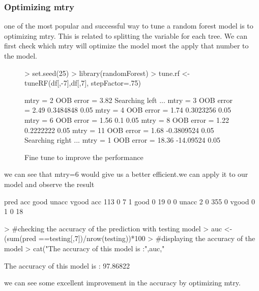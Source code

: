 \documentclass{article}
\begin{document}
\subsubsection{Optimizing mtry}
one of the  most popular and successful way to tune a random forest model is to optimizing mtry. This is related to splitting the variable for each tree. We can first check which mtry will optimize the model most the apply that number to the model.
\begin{figure}
\begin{Schunk}
\begin{Sinput}
> set.seed(25)
> library(randomForest)
> tune.rf <- tuneRF(df[,-7],df[,7], stepFactor=.75)
\end{Sinput}
\begin{Soutput}
mtry = 2  OOB error = 3.82% 
Searching left ...
mtry = 3 	OOB error = 2.49% 
0.3484848 0.05 
mtry = 4 	OOB error = 1.74% 
0.3023256 0.05 
mtry = 6 	OOB error = 1.56% 
0.1 0.05 
mtry = 8 	OOB error = 1.22% 
0.2222222 0.05 
mtry = 11 	OOB error = 1.68% 
-0.3809524 0.05 
Searching right ...
mtry = 1 	OOB error = 18.36% 
-14.09524 0.05 
\end{Soutput}
\end{Schunk}
\caption{Fine tune to improve the performance}
\end{figure}
\newpage
we can see that mtry=6 would give us a better efficient.we can apply it to our model and observe the result
\begin{Schunk}
\begin{Soutput}
pred    acc good unacc vgood
  acc   113    0     7     1
  good    0   19     0     0
  unacc   2    0   355     0
  vgood   0    1     0    18
\end{Soutput}
\begin{Sinput}
> #checking the accuracy of the prediction with testing model
> auc <- (sum(pred ==testing[,7])/nrow(testing))*100
> #displaying the accuracy of the model
> cat("The accuracy of this model is :",auc,"%")
\end{Sinput}
\begin{Soutput}
The accuracy of this model is : 97.86822 %
\end{Soutput}
\end{Schunk}
we can see some excellent improvement in the accuracy by optimizing mtry.
\break
\end{document}
